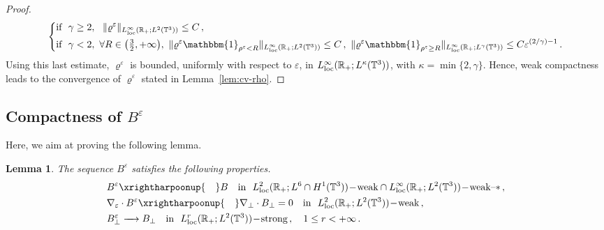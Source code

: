 \documentclass[11pt,reqno]{amsart}
\newtheorem{lemma}{Lemma}
\def \R{{\mathbb{R}}}
\def \T{{\mathbb{T}}}
\begin{document}
\begin{proof}
  \begin{equation}
    \label{eqn:varrhoeps-est}\left \{
    \begin{aligned}
    &\mbox{if } \ \gamma \geq 2,  \ \ \|\varrho^\varepsilon\|_{L_{\rm loc}^\infty(\R_+;L^2(\T^3))} \leq C\,,  \\
    & \mbox{if } \ \gamma < 2,\ \forall R\in\big(\tfrac 3 2,+\infty\big),\ \|\varrho^\varepsilon \mathbbm{1}_{\rho^\varepsilon<R}\|_{L_{\rm loc}^\infty(\R_+;L^2(\T^3))} \leq C\,, \
    \|\varrho^\varepsilon \mathbbm{1}_{\rho^\varepsilon\geq R}\|_{L_{\rm loc}^\infty(\R_+;L^\gamma(\T^3))}\leq C\varepsilon^{(2/\gamma)-1}\,.
    \end{aligned}
    \right.
  \end{equation}
  Using this last estimate, $\varrho^\varepsilon$ is bounded, uniformly with respect to $\varepsilon$, in $L_{\rm loc}^\infty(\R_+;L^\kappa(\T^3))$, with $\kappa=\min\{2,\gamma\}$. Hence, weak compactness leads to the convergence of $\varrho^\varepsilon$ stated in Lemma~\ref{lem:cv-rho}.
\end{proof}

  
\subsection{Compactness of $B^\varepsilon $}
Here, we aim at proving the following lemma.
\begin{lemma}
  \label{lem:cv-Bperp}
  The sequence ${B^\varepsilon}$ satisfies the following properties.
  \begin{align*}
    & B^\varepsilon \xrightharpoonup{\quad} B \ \ \mbox{ \rm in } \  L_{\rm loc}^2(\R_+;L^6\cap H^1(\T^3))\!-\!\mbox{\rm weak} \cap  L_{\rm loc}^\infty(\R_+ ;L^2(\T^3))\!-\!\mbox{\rm weak--}\ast\,,\\
    & \nabla_\varepsilon \cdot B^\varepsilon   \xrightharpoonup{\quad}\nabla_\perp \cdot B_\perp =0 \ \ \mbox{ \rm in } \  L_{\rm loc}^2(\R_+; L^2(\T^3))\!-\!\mbox{\rm weak}\,,\\
    &  B_\perp^\varepsilon \xrightarrow{\quad} B_\perp \ \ \mbox{ \rm in } \  L_{\rm loc}^r(\R_+; L^2(\T^3))\!-\!\mbox{\rm strong}\,, \quad 1\leq r < +\infty \,.
  \end{align*}
\end{lemma}
\end{document}
